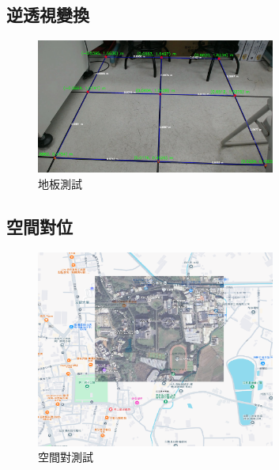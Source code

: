 \documentclass[12pt]{article}       %
\begin{document}

\subsection{逆透視變換}
\hspace{2em}
\begin{figure}[H]
    \centering
    \includegraphics[width=0.7\textwidth]{frame_with_points_real.jpg}     %
    \caption{地板測試}    %
    \label{fig:frame_with_points_real}    %
\end{figure}

\subsection{空間對位}
\hspace{2em}
\begin{figure}[H]
    \centering
    \includegraphics[width=0.7\textwidth]{1234567890.png}     %
    \caption{空間對測試}    %
    \label{fig:1234567890}    %
\end{figure}
\end{document}
